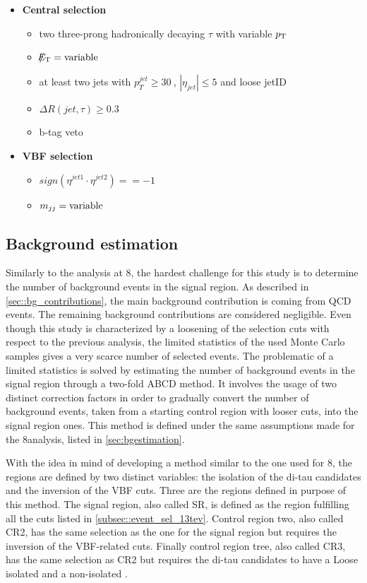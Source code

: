 \begin{itemize}
	\item \textbf{Central selection}
	\begin{itemize}
		\item two three-prong hadronically decaying $\tau$ with variable $p_{\text{T}}$
		\item $\slash\mkern-12mu{E}_{\text{T}} = \text{variable}$
		\item at least two jets with $p_{T}^{jet}\geq30~$\gev, $|\eta_{jet}|\leq5$ and loose jetID
		\item $\Delta R(jet,\tau)\geq0.3$
		\item b-tag veto
	\end{itemize}
	\item \textbf{VBF selection}
	\begin{itemize}
		\item $sign(\eta^{jet 1}\cdot\eta^{jet 2})==-1$
		\item $m_{jj} = \text{variable}$
	\end{itemize}
\end{itemize}

\subsection{Background estimation}

Similarly to the analysis at 8\tev, the hardest challenge for this study is to determine the number of background events in the signal region. As described in \autoref{sec::bg_contributions}, the main background contribution is coming from QCD events. The remaining background contributions are considered negligible. Even though this study is characterized by a loosening of the selection cuts with respect to the previous analysis, the limited statistics of the used Monte Carlo samples gives a very scarce number of selected events. The problematic of a limited statistics is solved by estimating the number of background events in the signal region through a two-fold ABCD method. It involves the usage of two distinct correction factors in order to gradually convert the number of background events, taken from a starting control region with looser cuts, into the signal region ones. This method is defined under the same assumptions made for the 8\tev analysis, listed in \autoref{sec:bgestimation}.

With the idea in mind of developing a method similar to the one used for 8\tev, the regions are defined by two distinct variables: the isolation of the di-tau candidates and the inversion of the VBF cuts. Three are the regions defined in purpose of this method. The signal region, also called SR, is defined as the region fulfilling all the cuts listed in \autoref{subsec::event_sel_13tev}. Control region two, also called CR2, has the same selection as the one for the signal region but requires the inversion of the VBF-related cuts. Finally control region tree, also called CR3, has the same selection as CR2 but requires the di-tau candidates to have a Loose isolated and a non-isolated \hadtau.

